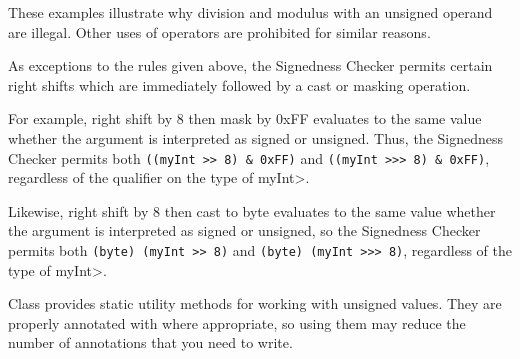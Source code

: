 These examples illustrate why division and modulus with an unsigned operand
are illegal.  Other uses of operators are prohibited for similar reasons.



As exceptions to the rules given above, the Signedness Checker permits
certain right shifts which are immediately followed by a cast or
masking operation.

For example, right shift by 8 then mask by 0xFF evaluates to the same value
whether the argument is interpreted as signed or unsigned.  Thus, the
Signedness Checker permits both \verb|((myInt >> 8) & 0xFF)| and
\verb|((myInt >>> 8) & 0xFF)|, regardless of the qualifier on the type of
\<myInt>.

Likewise, right shift by 8 then cast to byte evaluates to the
same value whether the argument is interpreted as signed or unsigned, so
the Signedness Checker permits both \verb|(byte) (myInt >> 8)| and
\verb|(byte) (myInt >>> 8)|, regardless of the type of \<myInt>.






Class  provides static
utility methods for working with unsigned values.  They are
properly annotated with 
where appropriate, so using them may reduce the number of annotations that
you need to write.


